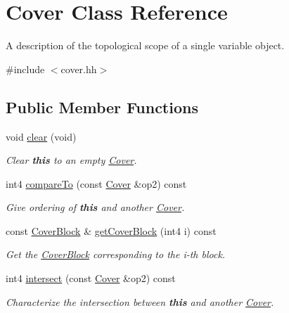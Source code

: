 \hypertarget{class_cover}{}\section{Cover Class Reference}
\label{class_cover}


A description of the topological scope of a single variable object.  




{\ttfamily \#include $<$cover.\+hh$>$}

\subsection*{Public Member Functions}
\begin{DoxyCompactItemize}
\item 
void \mbox{\hyperlink{class_cover_abd61e505d94ee4774057ea6f64bd2e45}{clear}} (void)
\begin{DoxyCompactList}\small\item\em Clear {\bfseries{this}} to an empty \mbox{\hyperlink{class_cover}{Cover}}. \end{DoxyCompactList}\item 
int4 \mbox{\hyperlink{class_cover_a68814b7596c3f4be6452792ca2961cb7}{compare\+To}} (const \mbox{\hyperlink{class_cover}{Cover}} \&op2) const
\begin{DoxyCompactList}\small\item\em Give ordering of {\bfseries{this}} and another \mbox{\hyperlink{class_cover}{Cover}}. \end{DoxyCompactList}\item 
const \mbox{\hyperlink{class_cover_block}{Cover\+Block}} \& \mbox{\hyperlink{class_cover_aa795f795e17e4860b810b068a61142ef}{get\+Cover\+Block}} (int4 i) const
\begin{DoxyCompactList}\small\item\em Get the \mbox{\hyperlink{class_cover_block}{Cover\+Block}} corresponding to the i-\/th block. \end{DoxyCompactList}\item 
int4 \mbox{\hyperlink{class_cover_ad296bbe5ac0596e41c9d65d11aeb3d05}{intersect}} (const \mbox{\hyperlink{class_cover}{Cover}} \&op2) const
\begin{DoxyCompactList}\small\item\em Characterize the intersection between {\bfseries{this}} and another \mbox{\hyperlink{class_cover}{Cover}}. \end{DoxyCompactList}\item 

\end{DoxyCompactItemize}
